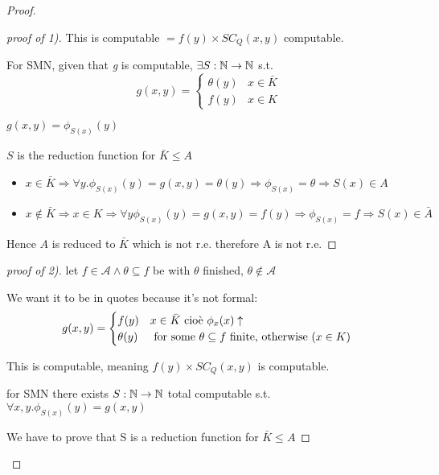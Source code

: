 \begin{proof}
\begin{proof}[proof of 1)]
    This is computable $ = f(y) \times SC_Q(x,y) $ computable.

    For SMN, given that \textit{g} is computable, $ \exists
    S:\mathbb{N}\rightarrow\mathbb{N} $ s.t.
    \begin{equation*}
      g(x,y) = \begin{cases}
        \theta(y) & x \in \bar{K} \\
        f(y) & x \in K
      \end{cases}
    \end{equation*}

    $ g(x,y) = \phi_{S(x)}(y)$

    $S$ is the reduction function for $ \bar{K}\leq A $

    \begin{itemize}
    \item $ x\in\bar{K} \Rightarrow \forall y. \phi_{S(x)}(y) = g(x,y) =
      \theta(y) \Rightarrow \phi_{S(x)} = \theta \Rightarrow S(x) \in A $
    \item $ x\not\in\bar{K}\Rightarrow x\in K\Rightarrow\forall
      y\phi_{S(x)}(y) = g(x,y)=f(y)\Rightarrow\phi_{S(x)}=f\Rightarrow
      S(x)\in\bar{A}$
    \end{itemize}

    Hence $A$ is reduced to $ \bar{K} $ which is not r.e. therefore A is
    not r.e.

  \end{proof}

  \begin{proof}[proof of 2)]
    let $ f\in\mathcal{A}\land\theta\subseteq f $ be with $ \theta $
    finished, $ \theta\not\in\mathcal{A} $

    We want it to be in quotes because it's not formal: \begin{equation*}
      g(x,y) = \begin{cases}
        f(y) & x \in\bar{K} $ cioè $ \phi_x(x)\uparrow \\
        \theta(y) & $ for some $ \theta\subseteq f $ finite, otherwise ($ x\in K $) $
      \end{cases}
    \end{equation*}

    This is computable, meaning $f(y) \times SC_Q(x,y) $ is
    computable.

    for SMN there exists $ S:\mathbb{N}\rightarrow\mathbb{N} $ total computable s.t. $
    \forall x,y. \phi_{S(x)}(y) = g(x,y) $

    We have to prove that S is a reduction function for $ \bar{K}\leq A $


\end{proof}
\end{proof}
